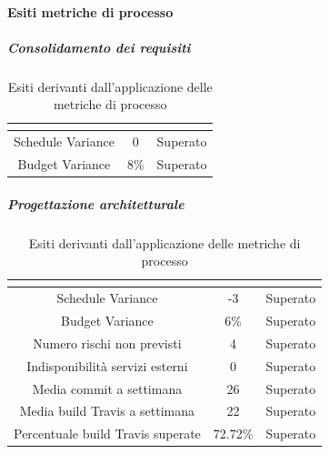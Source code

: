 \paragraph{Esiti metriche di processo}

\subparagraph{Consolidamento dei requisiti}\MiniSpazio
\renewcommand{\arraystretch}{1.5}
\begin{table}[H]
	\begin{center}
		\begin{tabular}{|c|c|c|}
			\hline
			\rowcolor{title_row}
			\textbf{\color{title_text}{Metrica}} & \textbf{\color{title_text}{Valore ottenuto}} & \textbf{\color{title_text}{Esito}} \\
			\hline
			{Schedule Variance} & {0} & {Superato}\\	
			\hline
			{Budget Variance} & {8\%} & {Superato}\\	
			\hline
		\end{tabular}
		\caption[Esiti metriche di processo, consolidamento dei requisiti]{Esiti derivanti dall'applicazione delle metriche di processo}	
		\label{tabella: esiti derivanti dall'applicazione delle metriche di processo cr}
	\end{center}
\end{table}


\subparagraph{Progettazione architetturale}\MiniSpazio
\renewcommand{\arraystretch}{1.5}
\begin{table}[H]
	\begin{center}
		\begin{tabular}{|c|c|c|}
			\hline
			\rowcolor{title_row}
			\textbf{\color{title_text}{Metrica}} & \textbf{\color{title_text}{Valore ottenuto}} & \textbf{\color{title_text}{Esito}} \\
			\hline
			{Schedule Variance} & {-3} & {Superato}\\	
			\hline	
			{Budget Variance} & {6\%} & {Superato}\\	
			\hline
			{Numero rischi non previsti} & {4} & {Superato}\\	
			\hline
			{Indisponibilità servizi esterni} & {0} & {Superato}\\	
			\hline
			{Media commit a settimana} & {26} & {Superato}\\	
			\hline
			{Media build Travis a settimana} & {22} & {Superato}\\	
			\hline
			{Percentuale build Travis superate} & {72.72\%} & {Superato}\\	
			\hline
		\end{tabular}
		\caption[Esiti metriche di processo, Progettazione Architetturale]{Esiti derivanti dall'applicazione delle metriche di processo}	
		\label{tabella: esiti derivanti dall'applicazione delle metriche di processo pa}
	\end{center}
\end{table}

